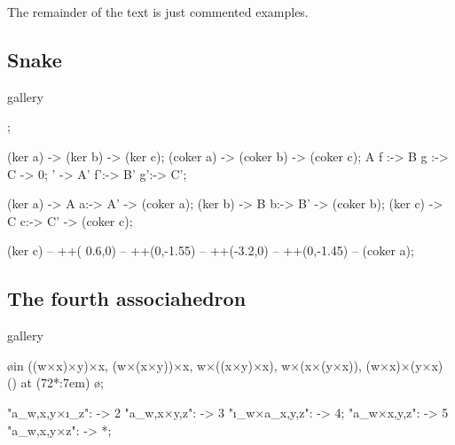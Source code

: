 
The remainder of the text is just commented examples.

\clearpage

\subsection{Snake}

\begin{tcblisting}{gallery}
\begin{kodi}[tetragonal]
  ;

  \mor   (ker a) ->   (ker b) ->   (ker c);
  \mor (coker a) -> (coker b) -> (coker c);
  \mor       A  f :-> B  g :-> C -> 0;
  ' -> A' f':-> B' g':-> C';

   (ker a) -> A a:-> A' -> (coker a);
   (ker b) -> B b:-> B' -> (coker b);
   (ker c) -> C c:-> C' -> (coker c);

  \draw[/kD/arrows/crossing over, ->, rounded corners, >=stealth]
    (ker c) -- ++( 0.6,0) -- ++(0,-1.55)
            -- ++(-3.2,0) -- ++(0,-1.45) -- (coker a);
\end{kodi}
\end{tcblisting}

\clearpage

\subsection{The fourth associahedron}

\begin{tcblisting}{gallery}
\begin{kodi}

  \foreach [count=\n] \o in {
      ((w×x)×y)×x,
      (w×(x×y))×x,
      w×((x×y)×x),
      w×(x×(y×x)),
      (w×x)×(y×x)
    } \obj (\n) at (72*\n:7em) {\o};

   "a_{w,x,y}×ı_z": -> 2
           "a_{w,x×y,z}": -> 3
         "ı_w×a_{x,y,z}": -> 4;
  \mor *   "a_{w×x,y,z}": -> 5
           "a_{w,x,y×z}": -> *;
\end{kodi}
\end{tcblisting}

